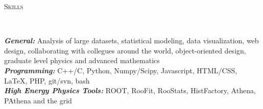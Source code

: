 \documentclass[9pt]{article}
\newenvironment{changemargin}[2]{%
  \begin{list}{}{%
    \setlength{\topsep}{0pt}%
    \setlength{\leftmargin}{#1}%
    \setlength{\rightmargin}{#2}%
    \setlength{\listparindent}{\parindent}%
    \setlength{\itemindent}{\parindent}%
    \setlength{\parsep}{\parskip}%
  }%
  \item[]}{\end{list}
}
\newcommand{\lineover}{
	\begin{changemargin}{-0.05in}{-0.05in}
		\vspace*{-8pt}
		\hrulefill \\
		\vspace*{-2pt}
	\end{changemargin}
}
\newcommand{\header}[1]{
	\begin{changemargin}{-0.5in}{-0.5in}
		\scshape{#1}\\
  	\lineover
	\end{changemargin}
}
\newenvironment{body} {
	\vspace*{-16pt}
	\begin{changemargin}{-0.25in}{-0.5in}
  }	
	{\end{changemargin}
}
\begin{document}
\header{Skills}

\begin{body}
	\vspace{14pt}
        \emph{\textbf{General:}}{} Analysis of large datasets, statistical modeling, data visualization, web design, collaborating with collegues around the world, object-oriented design, graduate level physics and advanced mathematics \\
        \smallskip
	\emph{\textbf{Programming:}}{} C++/C, Python, Numpy/Scipy, Javascript, HTML/CSS, \LaTeX, PHP, git/svn, bash \\
        \smallskip
	\emph{\textbf{High Energy Physics Tools:}}{} ROOT, RooFit, RooStats, HistFactory, Athena, PAthena and the grid \\
\end{body}

\smallskip
\end{document}
